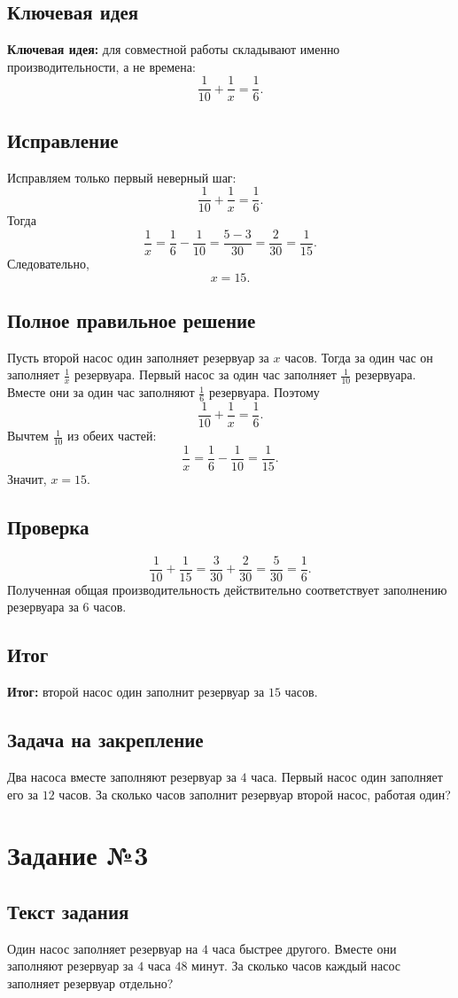 \documentclass[12pt,a4paper]{article}
\newcommand{\idea}{\textcolor{blue!60!black}{\textbf{Ключевая идея:}}}
\newcommand{\result}{\textcolor{teal!60!black}{\textbf{Итог:}}}
\newcommand{\tasksection}[1]{\section*{Задание №#1}}
\begin{document}
\subsection*{Ключевая идея}
\idea{} для совместной работы складывают именно производительности, а не времена:
\[
\frac{1}{10}+\frac{1}{x}=\frac{1}{6}.
\]

\subsection*{Исправление}
Исправляем только первый неверный шаг:
\[
\frac{1}{10}+\frac{1}{x}=\frac{1}{6}.
\]
Тогда
\[
\frac{1}{x}=\frac{1}{6}-\frac{1}{10}=\frac{5-3}{30}=\frac{2}{30}=\frac{1}{15}.
\]
Следовательно,
\[
x=15.
\]

\subsection*{Полное правильное решение}
Пусть второй насос один заполняет резервуар за $x$ часов. Тогда за один час он заполняет $\frac{1}{x}$ резервуара. Первый насос за один час заполняет $\frac{1}{10}$ резервуара. Вместе они за один час заполняют $\frac{1}{6}$ резервуара. Поэтому
\[
\frac{1}{10}+\frac{1}{x}=\frac{1}{6}.
\]
Вычтем $\frac{1}{10}$ из обеих частей:
\[
\frac{1}{x}=\frac{1}{6}-\frac{1}{10}=\frac{1}{15}.
\]
Значит, $x=15$.

\subsection*{Проверка}
\[
\frac{1}{10}+\frac{1}{15}=\frac{3}{30}+\frac{2}{30}=\frac{5}{30}=\frac{1}{6}.
\]
Полученная общая производительность действительно соответствует заполнению резервуара за $6$ часов.

\subsection*{Итог}
\result{} второй насос один заполнит резервуар за $15$ часов.

\subsection*{Задача на закрепление}
Два насоса вместе заполняют резервуар за $4$ часа. Первый насос один заполняет его за $12$ часов. За сколько часов заполнит резервуар второй насос, работая один?

\newpage
{}\label{task:3}
\tasksection{3}
\subsection*{Текст задания}
Один насос заполняет резервуар на $4$ часа быстрее другого. Вместе они заполняют резервуар за $4$ часа $48$ минут. За сколько часов каждый насос заполняет резервуар отдельно?
\end{document}
